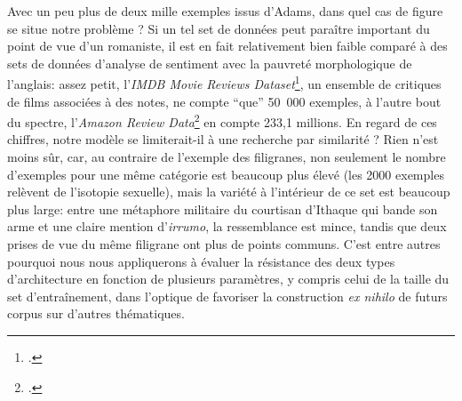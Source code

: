 Avec un peu plus de deux mille exemples issus d'Adams, dans quel cas de figure se situe notre problème ? Si un tel set de données peut paraître important du point de vue d'un romaniste, il est en fait relativement bien faible comparé à des sets de données d'analyse de sentiment avec la pauvreté morphologique de l'anglais: assez petit, l'\textit{IMDB Movie Reviews Dataset}\footcite{maas-EtAl:2011:ACL-HLT2011}, un ensemble de critiques de films associées à des notes, ne compte \enquote{que} 50~000 exemples, à l'autre bout du spectre, l'\textit{Amazon Review Data}\footcite{ni_justifying_2019} en compte 233,1 millions. En regard de ces chiffres, notre modèle se limiterait-il à une recherche par similarité ? Rien n'est moins sûr, car, au contraire de l'exemple des filigranes, non seulement le nombre d'exemples pour une même catégorie est beaucoup plus élevé (les 2000 exemples relèvent de l'isotopie sexuelle), mais la variété à l'intérieur de ce set est beaucoup plus large: entre une métaphore militaire du courtisan d'Ithaque qui bande son arme et une claire mention d'\textit{irrumo}, la ressemblance est mince, tandis que deux prises de vue du même filigrane ont plus de points communs. C'est entre autres pourquoi nous nous appliquerons à évaluer la résistance des deux types d'architecture en fonction de plusieurs paramètres, y compris celui de la taille du set d'entraînement, dans l'optique de favoriser la construction \textit{ex nihilo} de futurs corpus sur d'autres thématiques.


